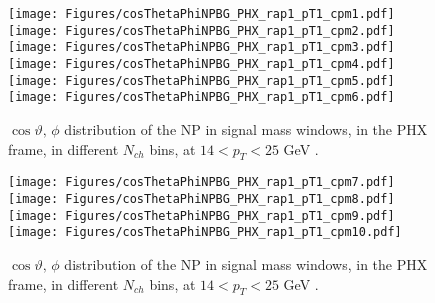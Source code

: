 \documentclass[12pt]{article}
\newcommand{\pt}{$p_{\mathrm{T}}$}
\begin{document}
%
%

\begin{figure}[htbp]
\centering
\texttt{[image: Figures/cosThetaPhiNPBG\_PHX\_rap1\_pT1\_cpm1.pdf]}
\texttt{[image: Figures/cosThetaPhiNPBG\_PHX\_rap1\_pT1\_cpm2.pdf]}
\texttt{[image: Figures/cosThetaPhiNPBG\_PHX\_rap1\_pT1\_cpm3.pdf]}
\texttt{[image: Figures/cosThetaPhiNPBG\_PHX\_rap1\_pT1\_cpm4.pdf]}
\texttt{[image: Figures/cosThetaPhiNPBG\_PHX\_rap1\_pT1\_cpm5.pdf]}
\texttt{[image: Figures/cosThetaPhiNPBG\_PHX\_rap1\_pT1\_cpm6.pdf]}
\caption{$\cos\vartheta,\,\phi$ distribution of the NP in signal mass windows, 
	in the PHX frame, in different $N_{ch}$ bins, at $14 < p_{T} < 25$ GeV .}
\end{figure}
\clearpage

\begin{figure}[htbp]
\centering
\texttt{[image: Figures/cosThetaPhiNPBG\_PHX\_rap1\_pT1\_cpm7.pdf]}
\texttt{[image: Figures/cosThetaPhiNPBG\_PHX\_rap1\_pT1\_cpm8.pdf]}
\texttt{[image: Figures/cosThetaPhiNPBG\_PHX\_rap1\_pT1\_cpm9.pdf]}
\texttt{[image: Figures/cosThetaPhiNPBG\_PHX\_rap1\_pT1\_cpm10.pdf]}
\caption{$\cos\vartheta,\,\phi$ distribution of the NP in signal mass windows, 
	in the PHX frame, in different $N_{ch}$ bins, at $14 < p_{T} < 25$ GeV .}
\end{figure}
\clearpage
\end{document}
